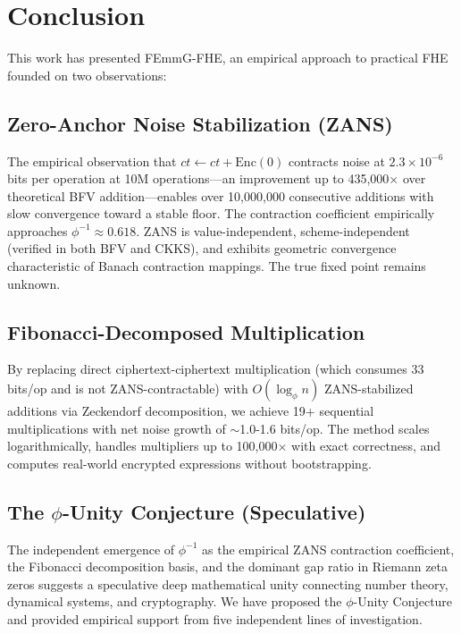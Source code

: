 \documentclass[11pt]{article}
\begin{document}
\section{Conclusion}

This work has presented FEmmG-FHE, an empirical approach to practical FHE founded on two observations:

\subsection{Zero-Anchor Noise Stabilization (ZANS)}

The empirical observation that $ct \leftarrow ct + \text{Enc}(0)$ contracts noise at $2.3 \times 10^{-6}$ bits per operation at 10M operations—an improvement up to 435,000$\times$ over theoretical BFV addition—enables over 10,000,000 consecutive additions with slow convergence toward a stable floor. The contraction coefficient empirically approaches $\phi^{-1} \approx 0.618$. ZANS is value-independent, scheme-independent (verified in both BFV and CKKS), and exhibits geometric convergence characteristic of Banach contraction mappings. The true fixed point remains unknown.

\subsection{Fibonacci-Decomposed Multiplication}

By replacing direct ciphertext-ciphertext multiplication (which consumes 33 bits/op and is not ZANS-contractable) with $O(\log_\phi n)$ ZANS-stabilized additions via Zeckendorf decomposition, we achieve 19+ sequential multiplications with net noise growth of $\sim$1.0-1.6 bits/op. The method scales logarithmically, handles multipliers up to 100,000$\times$ with exact correctness, and computes real-world encrypted expressions without bootstrapping.

\subsection{The $\phi$-Unity Conjecture (Speculative)}

The independent emergence of $\phi^{-1}$ as the empirical ZANS contraction coefficient, the Fibonacci decomposition basis, and the dominant gap ratio in Riemann zeta zeros suggests a speculative deep mathematical unity connecting number theory, dynamical systems, and cryptography. We have proposed the $\phi$-Unity Conjecture and provided empirical support from five independent lines of investigation.
\end{document}
